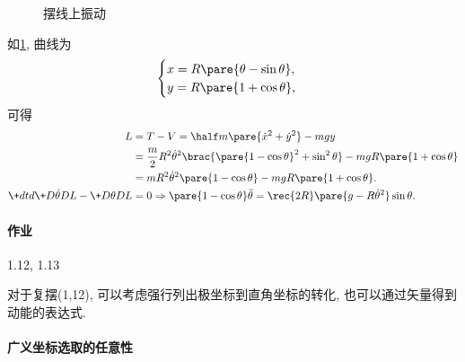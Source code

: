 \documentclass[../LectureNotes.tex]{subfiles}
\begin{document}
\begin{figure}[ht]
    \centering
    \caption{摆线上振动}
    \label{fig:摆线上振动}
\end{figure}
\begin{sample}
    \begin{ex}
        \label{ex:摆线上振动}
        如\cref{fig:摆线上振动}, 曲线为
        \[ \begin{cases}
            x = R\pare{\theta - \sin\theta}, \\
            y = R\pare{1+\cos\theta},
        \end{cases} \]
        可得
        \begin{align*}
            L &= T-V = \half m\pare{\dot{x}^2 + \dot{y}^2} - mgy \\
            &= \frac{m}{2} R^2\dot{\theta}^2 \brac{\pare{1-\cos\theta}^2 + \sin^2\theta} - mgR\pare{1+\cos\theta} \\
            &= mR^2\dot{\theta}^2\pare{1-\cos\theta} - mgR\pare{1+\cos\theta}. \\
            \+dtd{}\+D{\dot{\theta}}DL - \+D{\theta}D{L} & = 0 \Rightarrow \pare{1-\cos\theta}\ddot{\theta} = \rec{2R}\pare{g-R\dot{\theta}^2}\sin\theta.
        \end{align*}
    \end{ex}
\end{sample}

\paragraph{作业} %
\label{par:作业}

1.12, 1.13


\begin{remark}
    对于复摆(1,12), 可以考虑强行列出极坐标到直角坐标的转化, 也可以通过矢量得到动能的表达式.
\end{remark}

\paragraph{广义坐标选取的任意性} %
\label{par:广义坐标选取的任意性}
\end{document}
